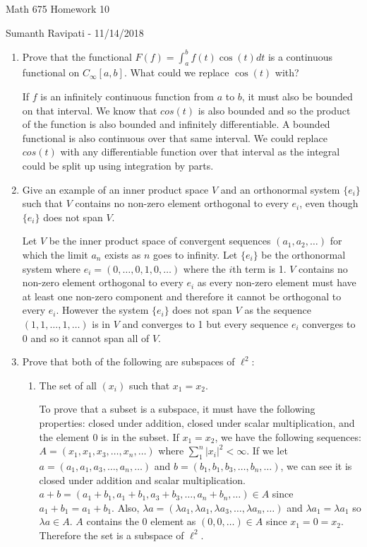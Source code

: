 \documentclass[12pt,letterpaper,reqno]{amsart}
\begin{document}
\thispagestyle{empty}
\centerline{\Large Math 675 Homework 10}
\centerline{Sumanth Ravipati - 11/14/2018}
\vspace{.25in}

\begin{enumerate}[1.]
\item Prove that the functional $F(f)=\int_a^b f(t) \cos(t)dt$ is a continuous functional on $C_\infty[a,b]$. What could we replace $\cos(t)$ with?
\begin{flushleft}
If $f$ is an infinitely continuous function from $a$ to $b$, it must also be bounded on that interval. We know that $cos(t)$ is also bounded and so the product of the function is also bounded and infinitely differentiable. A bounded functional is also continuous over that same interval. We could replace $cos(t)$ with any differentiable function over that interval as the integral could be split up using integration by parts.
\end{flushleft}
\item Give an example of an inner product space $V$ and an orthonormal system $\{e_i\}$ such that $V$ contains no non-zero element orthogonal to every $e_i$, even though $\{e_i\}$ does not span $V$.
\begin{flushleft}
Let $V$ be the inner product space of convergent sequences $(a_1, a_2, \ldots)$ for which the limit $a_n$ exists as $n$ goes to infinity. Let $\{e_i\}$ be the orthonormal system where $e_i = (0, \ldots, 0, 1, 0, \ldots)$ where the $i$th term is 1. $V$ contains no non-zero element orthogonal to every $e_i$ as every non-zero element must have at least one non-zero component and therefore it cannot be orthogonal to every $e_i$. However the system $\{e_i\}$ does not span $V$ as the sequence $(1, 1, \ldots, 1, \ldots)$ is in $V$ and converges to 1 but every sequence $e_i$ converges to 0 and so it cannot span all of $V$.
\end{flushleft}
\item Prove that both of the following are subspaces of $\ell^2$:
\begin{enumerate}
\item The set of all $(x_i)$ such that $x_1=x_2$.\begin{flushleft}
To prove that a subset is a subspace, it must have the following properties: closed under addition, closed under scalar multiplication, and the element 0 is in the subset. If $x_1 = x_2$, we have the following sequences: $A = (x_1, x_1, x_3, \ldots, x_n, \ldots)$ where $\sum\limits_1^n |x_i|^2 < \infty$. If we let $a = (a_1, a_1, a_3, \ldots, a_n, \ldots)$ and $b = (b_1, b_1, b_3, \ldots, b_n, \ldots)$, we can see it is closed under addition and scalar multiplication. $a + b = (a_1 + b_1, a_1 + b_1, a_3 + b_3, \ldots, a_n + b_n, \ldots) \in A$ since $a_1 + b_1 = a_1 + b_1$. Also, $\lambda a = (\lambda a_1, \lambda a_1, \lambda a_3, \ldots, \lambda a_n, \ldots)$ and $\lambda a_1 = \lambda a_1$ so $\lambda a \in A$. $A$ contains the 0 element as $(0, 0, \ldots) \in A$ since $x_1 = 0 = x_2$. Therefore the set is a subspace of $\ell^2$.

\end{flushleft}
\end{enumerate}
\end{enumerate}
\end{document}
